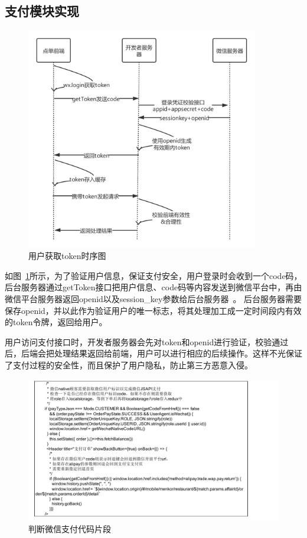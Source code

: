 \subsection{支付模块实现}
\begin{figure}[htbp!]
    \centering
    \includegraphics[width=4in]{FIGs/chapter4/pay_token.pdf}
    \caption{用户获取token时序图}\label{fig_pay_token}
\end{figure}

如图~\ref{fig_pay_token}所示，为了验证用户信息，保证支付安全，用户登录时会收到一个code码，后台服务器通过getToken接口把用户信息、code码等内容发送到微信平台中，再由微信平台服务器返回openid以及session\_key参数给后台服务器~\cite{lby2019}。
后台服务器需要保存openid，并以此作为验证用户的唯一标志，将其处理加工成一定时间段内有效的token令牌，返回给用户。

用户访问支付接口时，开发者服务器会先对token和openid进行验证，校验通过后，后端会把处理结果返回给前端，用户可以进行相应的后续操作。这样不光保证了支付过程的安全性，而且保护了用户隐私，防止第三方恶意入侵。

\begin{figure}[htbp!]
    \centering
    \includegraphics[width=\linewidth]{FIGs/chapter4/2.pdf}
    \caption{判断微信支付代码片段}\label{fig_pay_2}
\end{figure}

